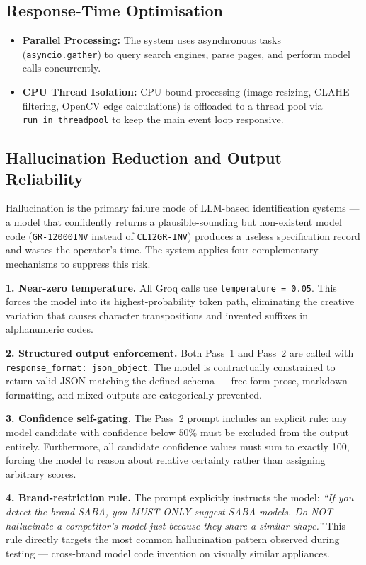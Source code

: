 \subsection{Response-Time Optimisation}

\begin{itemize}
  \item \textbf{Parallel Processing:} The system uses asynchronous tasks (\texttt{asyncio.gather}) to query search engines, parse pages, and perform model calls concurrently.
  \item \textbf{CPU Thread Isolation:} CPU-bound processing (image resizing, CLAHE filtering, OpenCV edge calculations) is offloaded to a thread pool via \texttt{run\_in\_threadpool} to keep the main event loop responsive.
\end{itemize}

\subsection{Hallucination Reduction and Output Reliability}

Hallucination is the primary failure mode of LLM-based identification systems — a model that confidently returns a plausible-sounding but non-existent model code (\texttt{GR-12000INV} instead of \texttt{CL12GR-INV}) produces a useless specification record and wastes the operator's time. The system applies four complementary mechanisms to suppress this risk.

\textbf{1. Near-zero temperature.} All Groq calls use \texttt{temperature = 0.05}. This forces the model into its highest-probability token path, eliminating the creative variation that causes character transpositions and invented suffixes in alphanumeric codes.

\textbf{2. Structured output enforcement.} Both Pass~1 and Pass~2 are called with \texttt{response\_format: json\_object}. The model is contractually constrained to return valid JSON matching the defined schema — free-form prose, markdown formatting, and mixed outputs are categorically prevented.

\textbf{3. Confidence self-gating.} The Pass~2 prompt includes an explicit rule: any model candidate with confidence below $50\%$ must be excluded from the output entirely. Furthermore, all candidate confidence values must sum to exactly 100, forcing the model to reason about relative certainty rather than assigning arbitrary scores.

\textbf{4. Brand-restriction rule.} The prompt explicitly instructs the model: \textit{``If you detect the brand SABA, you MUST ONLY suggest SABA models. Do NOT hallucinate a competitor's model just because they share a similar shape.''} This rule directly targets the most common hallucination pattern observed during testing — cross-brand model code invention on visually similar appliances.


